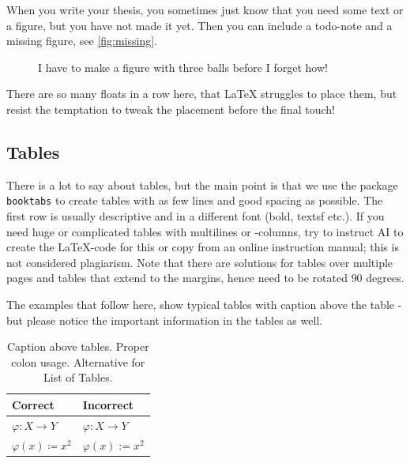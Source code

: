 When you write your thesis, you sometimes just know that you need some text or a figure, but you have not made it yet. Then you can include a todo-note and a missing figure, see \vref{fig:missing}. 

\begin{figure}
    \centering
    \caption[Three balls]{I have to make a figure with three balls before I forget how!}
    \label{fig:missing}
\end{figure}

\begin{remark}
    There are so many floats in a row here, that \LaTeX\; struggles to place them, but resist the temptation to tweak the placement before the final touch!
\end{remark}

\subsection{Tables}
There is a lot to say about tables, but the main point is that we use the package \texttt{booktabs} to create tables with as few lines and good spacing as possible. The first row is usually descriptive and in a different font (bold, textsf etc.). If you need huge or complicated tables with multilines or -columns, try to instruct AI to create the \LaTeX-code for this or copy from an online instruction manual; this is not considered plagiarism. Note that there are solutions for tables over multiple pages and tables that extend to the margins, hence need to be rotated $90$ degrees.

The examples that follow here, show typical tables with caption above the table - but please notice the important information in the tables as well.

\begin{table}
    \centering
       \caption[Colons (to appear in LOT)]{Caption above tables. Proper colon usage. Alternative for List of Tables.}
           \label{tab:colon}
    \begin{tabular}{@{}ll@{}}
        \toprule
        \textsf{Correct}               & \textsf{Incorrect}      \\
        \midrule
        \( \varphi \colon X \to Y \)   & \( \varphi : X \to Y \) \\[0.5ex]
        \( \varphi(x) \coloneqq x^2 \) & \( \varphi(x) := x^2 \) \\
        \bottomrule
    \end{tabular}
\end{table}

